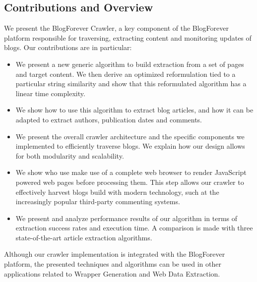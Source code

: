 \subsection{Contributions and Overview}
We present the BlogForever Crawler, a key component of the BlogForever platform responsible for traversing, extracting content and monitoring updates of blogs.
Our contributions are in particular:

\begin{itemize}
  \item We present a new generic algorithm to build extraction from a set of pages and target content. We then derive an optimized reformulation tied to a particular string similarity and show that this reformulated algorithm has a linear time complexity.
  \item We show how to use this algorithm to extract blog articles, and how it can be adapted to extract authors, publication dates and comments.
  \item We present the overall crawler architecture and the specific components we implemented to efficiently traverse blogs. We explain how our design allows for both modularity and scalability.
  \item We show who use make use of a complete web browser to render JavaScript powered web pages before processing them. This step allows our crawler to effectively harvest blogs build with modern technology, such at the increasingly popular third-party commenting systems.
  \item We present and analyze performance results of our algorithm in terms of extraction success rates and execution time. A comparison is made with three state-of-the-art article extraction algorithms.
\end{itemize}

Although our crawler implementation is integrated with the BlogForever platform, the presented techniques and algorithms can be used in other applications related to Wrapper Generation and Web Data Extraction.
